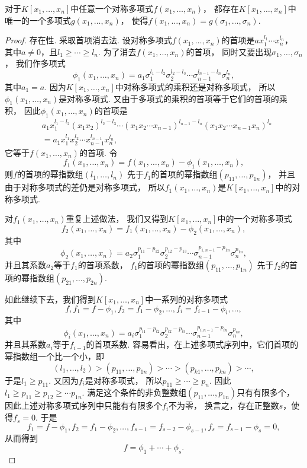\begin{theorem}[对称多项式基本定理]
对于\(K[x_1,\dotsc,x_n]\)中任意一个对称多项式\(f(x_1,\dotsc,x_n)\)，
都存在\(K[x_1,\dotsc,x_n]\)中唯一的一个多项式\(g(x_1,\dotsc,x_n)\)，
使得\(f(x_1,\dotsc,x_n)=g(\sigma_1,\dotsc,\sigma_n)\).
\begin{proof}
存在性.
采取首项消去法.
设对称多项式\(f(x_1,\dotsc,x_n)\)的首项是\(a x_1^{l_1} \dotsm x_n^{l_n}\)，
其中\(a\neq0\)，且\(l_1 \geq \dotsb \geq l_n\).
为了消去\(f(x_1,\dotsc,x_n)\)的首项，
同时又要出现\(\sigma_1,\dotsc,\sigma_n\)，
我们作多项式\[
	\phi_1(x_1,\dotsc,x_n)
	= a_1 \sigma_1^{l_1-l_2} \sigma_2^{l_2-l_3}
	\dotsm \sigma_{n-1}^{l_{n-1}-l_n} \sigma_n^{l_n},
\]
其中\(a_1=a\).
因为\(K[x_1,\dotsc,x_n]\)中对称多项式的乘积还是对称多项式，
所以\(\phi_1(x_1,\dotsc,x_n)\)是对称多项式.
又由于多项式的乘积的首项等于它们的首项的乘积，
因此\(\phi_1(x_1,\dotsc,x_n)\)的首项是\begin{align*}
	&a_1 x_1^{l_1-l_2} (x_1 x_2)^{l_2-l_3}
	\dotsm (x_1 x_2 \dotsm x_{n-1})^{l_{n-1}-l_n}
	(x_1 x_2 \dotsm x_{n-1} x_n)^{l_n} \\
	&= a_1 x_1^{l_1} x_2^{l_2} \dotsm x_{n-1}^{l_{n-1}} x_n^{l_n},
\end{align*}
它等于\(f(x_1,\dotsc,x_n)\)的首项.
令\[
	f_1(x_1,\dotsc,x_n)
	=f(x_1,\dotsc,x_n)
	-\phi_1(x_1,\dotsc,x_n),
\]
则\(f\)的首项的幂指数组\((l_1,\dotsc,l_n)\)
先于\(f_1\)的首项的幂指数组\((p_{11},\dotsc,p_{1n})\)，
并且由于对称多项式的差仍是对称多项式，
所以\(f_1(x_1,\dotsc,x_n)\)是\(K[x_1,\dotsc,x_n]\)中的对称多项式.

对\(f_1(x_1,\dotsc,x_n)\)重复上述做法，
我们又得到\(K[x_1,\dotsc,x_n]\)中的一个对称多项式\[
	f_2(x_1,\dotsc,x_n)
	=f_1(x_1,\dotsc,x_n)
	-\phi_2(x_1,\dotsc,x_n),
\]
其中\[
	\phi_2(x_1,\dotsc,x_n)
	=a_2 \sigma_1^{p_{11}-p_{12}} \sigma_2^{p_{12}-p_{13}}
	\dotsm \sigma_{n-1}^{p_{1,n-1}-p_{1n}} \sigma_n^{p_{1n}},
\]
并且其系数\(a_2\)等于\(f_1\)的首项系数，
\(f_1\)的首项的幂指数组\((p_{11},\dotsc,p_{1n})\)
先于\(f_2\)的首项的幂指数组\((p_{21},\dotsc,p_{2n})\).

如此继续下去，我们得到\(K[x_1,\dotsc,x_n]\)中一系列的对称多项式\[
	f,
	f_1=f-\phi_1,
	f_2=f_1-\phi_2,
	\dotsc,
	f_i=f_{i-1}-\phi_i,
	\dotsc,
\]
其中\[
	\phi_i(x_1,\dotsc,x_n)
	=a_i \sigma_1^{p_{i1}-p_{i2}} \sigma_2^{p_{i2}-p_{i3}}
	\dotsm \sigma_{n-1}^{p_{i,n-1}-p_{in}} \sigma_n^{p_{in}},
\]
并且其系数\(a_i\)等于\(f_{i-1}\)的首项系数.
容易看出，在上述多项式序列中，它们首项的幂指数组一个比一个小，即\[
	(l_1,\dotsc,l_2)
	>(p_{11},\dotsc,p_{1n})
	>\dotsb
	>(p_{k1},\dotsc,p_{kn})
	>\dotsb,
\]
于是\(l_1 \geq p_{11}\).
又因为\(f_i\)是对称多项式，
所以\(p_{11} \geq \dotsb \geq p_n\).
因此\(l_1 \geq p_{11} \geq p_{12} \geq \dotsb p_{1n}\).
满足这个条件的非负整数组\((p_{11},\dotsc,p_{1n})\)只有有限多个，
因此上述对称多项式序列中只能有有限多个\(f_i\)不为零，
换言之，存在正整数\(s\)，使得\(f_s=0\).
于是\[
	f_1=f-\phi_1,
	f_2=f_1-\phi_2,
	\dotsc,
	f_{s-1}=f_{s-2}-\phi_{s-1},
	f_s=f_{s-1}-\phi_s=0,
\]
从而得到\[
	f=\phi_1+\dotsb+\phi_s.
\]


\end{proof}
\end{theorem}
